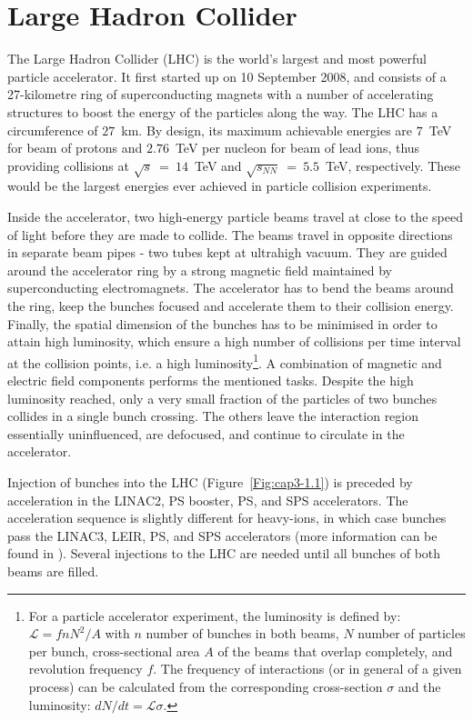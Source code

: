 

\label{cap:3}

\section{Large Hadron Collider}
\label{par:3.1}
The Large Hadron Collider (LHC) is the world's largest and most powerful particle accelerator. It first started up on 10 September 2008, and consists of a 27-kilometre ring of superconducting magnets with a number of accelerating structures to boost the energy of the particles along the way. The LHC has a circumference of \mbox{$27$ km}. By design, its maximum achievable energies are \mbox{$7$ TeV} for beam of protons and \mbox{$2.76$ TeV} per nucleon for beam of lead ions, thus providing collisions at \mbox{$\sqrt{s}$ = $14$ TeV} and \mbox{$\sqrt{s_{NN}}$ = $5.5$ TeV}, respectively. These would be the largest energies ever achieved in particle collision experiments.


Inside the accelerator, two high-energy particle beams travel at close to the speed of light before they are made to collide. The beams travel in opposite directions in separate beam pipes - two tubes kept at ultrahigh vacuum. They are guided around the accelerator ring by a strong magnetic field maintained by superconducting electromagnets. The accelerator has to bend the beams around the ring, keep the bunches focused and accelerate them to their collision energy. Finally, the spatial dimension of the bunches has to be minimised in order to attain high luminosity, which ensure a high number of collisions per time interval at the collision points, i.e. a high luminosity\footnote{For a particle accelerator experiment, the luminosity is defined by: \mbox{$\mathcal{L} = fnN^{2}/A$} with $n$ number of bunches in both beams, $N$ number of particles per bunch, cross-sectional area $A$ of the beams that overlap completely, and revolution frequency $f$. The frequency of interactions (or in general of a given process) can be calculated from the corresponding cross-section $\sigma$ and the luminosity: \mbox{$dN/dt = \mathcal{L}\sigma$}.}. A combination of magnetic and electric field components performs the mentioned tasks. Despite the high luminosity reached, only a very small fraction of the particles of two bunches collides in a single bunch crossing. The others leave the interaction region essentially uninfluenced, are defocused, and continue to circulate in the accelerator.


Injection of bunches into the LHC (\mbox{Figure \ref{Fig:cap3-1.1}}) is preceded by acceleration in the LINAC2, PS booster, PS, and SPS accelerators. The acceleration sequence is slightly different for heavy-ions, in which case bunches pass the LINAC3, LEIR, PS, and SPS accelerators (more information can be found in \cite{LHC04}). Several injections to the LHC are needed until all bunches of both beams are filled. 

